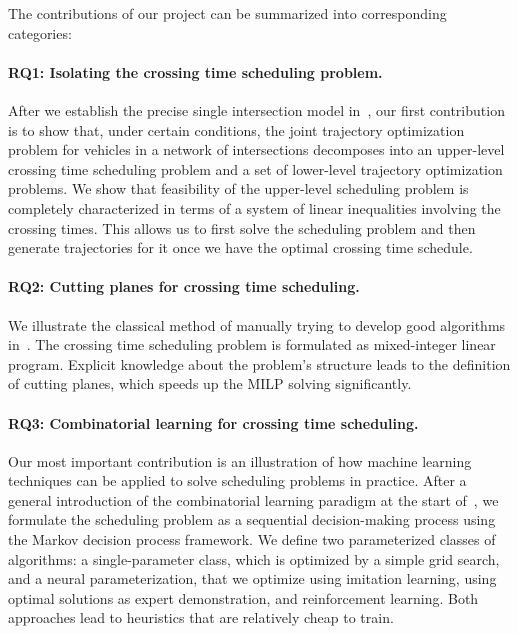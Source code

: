\documentclass{report}
\theoremstyle{definition}
\theoremstyle{plain}
\begin{document}

\pagebreak
The contributions of our project can be summarized into corresponding
categories:

\paragraph{RQ1: Isolating the crossing time scheduling problem.}

After we establish the precise single intersection model in~,
our first contribution is to show that, under certain conditions, the joint
trajectory optimization problem for vehicles in a network of intersections
decomposes into an upper-level crossing time scheduling problem and a set of
lower-level trajectory optimization problems. We show that feasibility of the
upper-level scheduling problem is completely characterized in terms of a system
of linear inequalities involving the crossing times. This allows us to first
solve the scheduling problem and then generate trajectories for it once we have
the optimal crossing time schedule.

\paragraph{RQ2: Cutting planes for crossing time scheduling.}

We illustrate the classical method of manually trying to develop good algorithms
in~.
%
The crossing time scheduling problem is formulated as mixed-integer linear
program. Explicit knowledge about the problem's structure leads to the
definition of cutting planes, which speeds up the MILP solving significantly.

\paragraph{RQ3: Combinatorial learning for crossing time scheduling.}

Our most important contribution is an illustration of how machine learning
techniques can be applied to solve scheduling problems in practice.
%
After a general introduction of the combinatorial learning paradigm at the start
of~, we formulate the scheduling problem as a
sequential decision-making process using the Markov decision process framework.
%
We define two parameterized classes of algorithms: a single-parameter class,
which is optimized by a simple grid search, and a neural parameterization, that
we optimize using imitation learning, using optimal solutions as expert
demonstration, and reinforcement learning.
%
Both approaches lead to heuristics that are relatively cheap to train.
\end{document}
